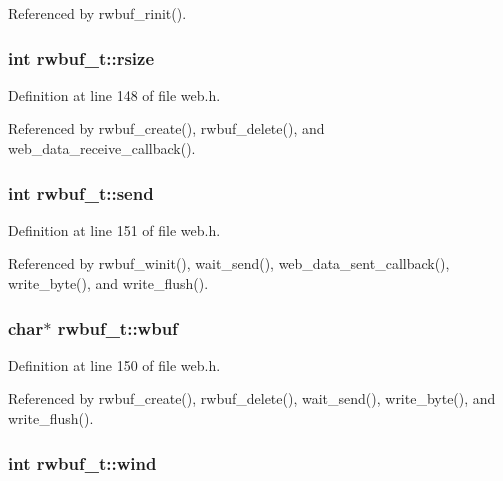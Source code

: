 Referenced by rwbuf\-\_\-rinit().

\hypertarget{structrwbuf__t_aa4094c7e329ae85cc50dbd06d3b50d44}{
\subsubsection[{rsize}]{\setlength{\rightskip}{0pt plus 5cm}int rwbuf\-\_\-t\-::rsize}}\label{structrwbuf__t_aa4094c7e329ae85cc50dbd06d3b50d44}


Definition at line 148 of file web.\-h.



Referenced by rwbuf\-\_\-create(), rwbuf\-\_\-delete(), and web\-\_\-data\-\_\-receive\-\_\-callback().

\hypertarget{structrwbuf__t_a279490994b6576ad00900254a8c07a89}{
\subsubsection[{send}]{\setlength{\rightskip}{0pt plus 5cm}int rwbuf\-\_\-t\-::send}}\label{structrwbuf__t_a279490994b6576ad00900254a8c07a89}


Definition at line 151 of file web.\-h.



Referenced by rwbuf\-\_\-winit(), wait\-\_\-send(), web\-\_\-data\-\_\-sent\-\_\-callback(), write\-\_\-byte(), and write\-\_\-flush().

\hypertarget{structrwbuf__t_a68386231f3d907ec4508c090925782a2}{
\subsubsection[{wbuf}]{\setlength{\rightskip}{0pt plus 5cm}char$\ast$ rwbuf\-\_\-t\-::wbuf}}\label{structrwbuf__t_a68386231f3d907ec4508c090925782a2}


Definition at line 150 of file web.\-h.



Referenced by rwbuf\-\_\-create(), rwbuf\-\_\-delete(), wait\-\_\-send(), write\-\_\-byte(), and write\-\_\-flush().

\hypertarget{structrwbuf__t_a135345eee44e93f37e57dbabec12c339}{
\subsubsection[{wind}]{\setlength{\rightskip}{0pt plus 5cm}int rwbuf\-\_\-t\-::wind}}\label{structrwbuf__t_a135345eee44e93f37e57dbabec12c339}


